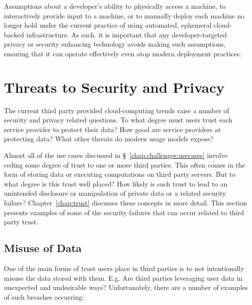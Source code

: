 Assumptions about a developer's ability to physically access a
machine, to interactively provide input to a machine, or to manually
deploy each machine no longer hold under the current practice of using
automated, ephemeral cloud-backed infrastructure. As such. it is
important that any developer-targeted privacy or security enhancing
technology avoids making such assumptions, ensuring that it can
operate effectively even atop modern deployment practices.

\section{Threats to Security and Privacy}
\label{chap:challenges:threats}

The current third party provided cloud-computing trends raise a number
of security and privacy related questions. To what degree must users
trust each service provider to protect their data? How good are
service providers at protecting data? What other threats do modern
usage models expose?

Almost all of the use cases discussed in
\S~\ref{chap:challenges:usecases} involve ceding some degree of trust
to one or more third parties. This often comes in the form of storing
data or executing computations on third party servers. But to what
degree is this trust well placed? How likely is such trust to lead to
an unintended disclosure or manipulation of private data or a related
security failure? Chapter~\ref{chap:trust} discusses these concepts in
more detail. This section presents examples of some of the security
failures that can occur related to third party trust.

\subsection{Misuse of Data}

One of the main forms of trust users place in third parties is to not
intentionally misuse the data stored with them. E.g. Are third parties
leveraging user data in unexpected and undesirable ways?
Unfortunately, there are a number of examples of such breaches
occurring:

